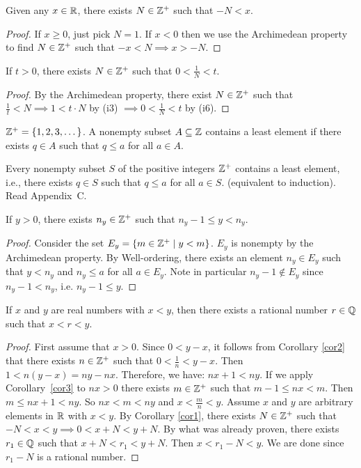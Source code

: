 \documentclass[]{article}
\begin{document}
\begin{corollary}
	Given any $x\in\mathbb{R}$, there exists $N\in\mathbb{Z}^+$ such that $-N<x$.
	\label{cor1}
\end{corollary}
\begin{proof}
	If $x\geq 0$, just pick $N=1$. If $x<0$ then we use the Archimedean property to find $N\in\mathbb{Z}^+$ such that $-x<N \implies x>-N$.
\end{proof}
\begin{corollary}
	If $t>0$, there exists $N\in\mathbb{Z}^+$ such that $0<\frac{1}{N}<t$.
	\label{cor2}
\end{corollary}
\begin{proof}
	By the Archimedean property, there exist $N\in\mathbb{Z}^+$ such that $\frac{1}{t}<N \implies 1<t\cdot N$ by (i3) $\implies 0<\frac{1}{N}<t$ by (i6).
\end{proof}
\begin{definition}
	$\mathbb{Z}^+ = \{1,2,3,\dots\}$.
	A nonempty subset $A\subseteq \mathbb{Z}$ contains a least element if there exists $q\in A$ such that $q\leq a$ for all $a\in A$.
\end{definition}
\begin{proposition}
	 Every nonempty subset $S$ of the positive integers $\mathbb{Z}^+$ contains a least element, i.e., there exists $q\in S$ such that $q\leq a$ for all $a\in S$. (equivalent to induction).
	Read Appendix~C.
\end{proposition}
\begin{corollary}
	If $y>0$, there exists $n_y\in\mathbb{Z}^+$ such that $n_y-1\leq y<n_y$.
	\label{cor3}
\end{corollary}
\begin{proof}
	Consider the set $E_y = \{m\in\mathbb{Z}^+ \mid y< m\}$. $E_y$ is  nonempty by the Archimedean property. By Well-ordering, there exists an element $n_y\in E_y$ such that $y<n_y$ and $n_y \leq a$ for all $a\in E_y$. Note in particular $n_y-1\notin E_y$ since $n_y-1<n_y$, i.e. $n_y-1\leq y$.
\end{proof}
\begin{theorem}
	 If $x$ and $y$ are real numbers with $x<y$, then there exists a rational number $r\in \mathbb{Q}$ such that $x<r<y$.
\end{theorem}
\begin{proof}
	First assume that $x>0$. Since $0<y-x$, it follows from Corollary \ref{cor2} that there exists $n\in\mathbb{Z}^+$ such that $0<\frac{1}{n}<y-x$. Then $1<n(y-x) = ny-nx$. Therefore, we have: $nx+1<ny$. If we apply Corollary~\ref{cor3} to $nx>0$ there exists $m\in\mathbb{Z}^+$ such that $m-1\leq nx<m$. Then $m\leq nx+1 < ny$. So $nx<m<ny$ and $x<\frac{m}{n}<y$.
	Assume $x$ and $y$ are arbitrary elements in $\mathbb{R}$ with $x<y$. By Corollary \ref{cor1}, there exists $N\in \mathbb{Z}^+$ such that $-N<x<y \implies 0< x+N < y+N$. By what was already proven, there exists $r_1\in\mathbb{Q}$ such that $x+N<r_1<y+N$. Then $x<r_1-N<y$. We are done since $r_1-N$ is a rational number.
\end{proof}
\end{document}
